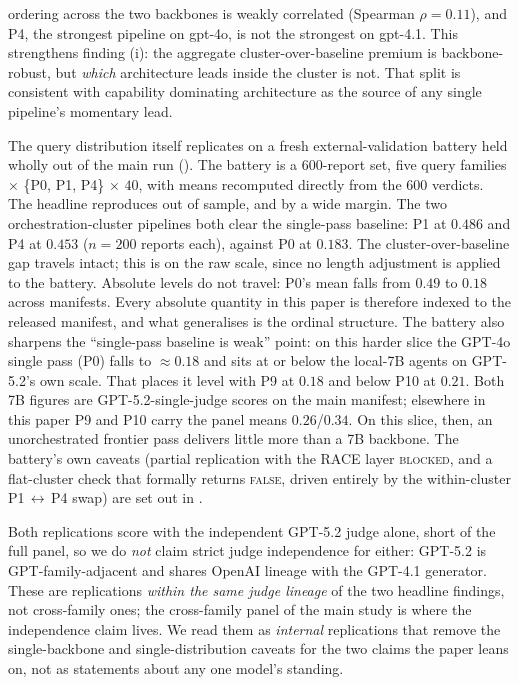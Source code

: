 \documentclass[11pt]{article}
\begin{document}
ordering across the two backbones is weakly correlated (Spearman $\rho=0.11$), and P4,
the strongest pipeline on gpt-4o, is not the strongest on gpt-4.1. This strengthens
finding (i): the aggregate cluster-over-baseline premium
is backbone-robust, but \emph{which} architecture leads inside the cluster is not. That
split is consistent with capability dominating architecture as the source of any single
pipeline's momentary lead.

The query distribution itself replicates on a fresh external-validation battery held
wholly out of the main run (). The battery is a $600$-report set, five
query families $\times$ \{P0, P1, P4\} $\times$ $40$, with means recomputed directly
from the $600$ verdicts. The headline reproduces out of sample, and by a wide margin.
The two orchestration-cluster pipelines both clear the single-pass baseline: P1 at
$0.486$ and P4 at $0.453$ ($n{=}200$ reports each), against P0 at $0.183$. The
cluster-over-baseline gap travels intact; this is on the raw scale, since no length
adjustment is applied to the battery. Absolute levels do not travel: P0's mean falls
from $0.49$ to $0.18$ across manifests. Every absolute quantity in this paper is
therefore indexed to the released manifest, and what generalises is the ordinal
structure. The battery also sharpens the ``single-pass baseline is weak'' point: on this
harder slice the GPT-4o single pass (P0) falls to $\approx\!0.18$ and sits at or below
the local-7B agents on GPT-5.2's own scale. That places it level with P9 at $0.18$ and
below P10 at $0.21$. Both 7B figures are GPT-5.2-single-judge scores on the main
manifest; elsewhere in this paper P9 and P10 carry the panel means $0.26$/$0.34$. On
this slice, then, an unorchestrated frontier pass delivers little more than a 7B backbone.
The battery's own caveats (partial
replication with the RACE layer \textsc{blocked}, and a flat-cluster check that formally
returns \textsc{false}, driven entirely by the within-cluster P1\,$\leftrightarrow$\,P4 swap)
are set out in .

Both replications score with the independent GPT-5.2 judge alone, short of the full
panel, so we do \emph{not} claim strict judge independence for either: GPT-5.2 is
GPT-family-adjacent and shares OpenAI lineage with the GPT-4.1 generator. These are
replications \emph{within the same judge lineage} of the two headline findings, not cross-family
ones; the cross-family panel of the main study is where the
independence claim lives. We read them as \emph{internal} replications that remove the
single-backbone and single-distribution caveats for the two claims the paper leans on,
not as statements about any one model's standing.
\end{document}
